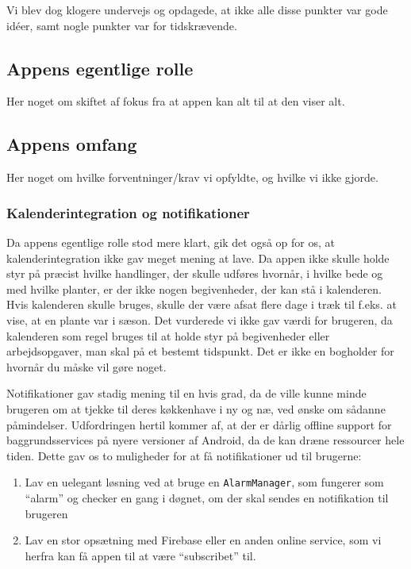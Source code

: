 Vi blev dog klogere undervejs og opdagede, at ikke alle disse punkter var gode idéer, samt nogle punkter var for tidskrævende.

\subsection{Appens egentlige rolle}
Her noget om skiftet af fokus fra at appen kan alt til at den viser alt.

\subsection{Appens omfang}
Her noget om hvilke forventninger/krav vi opfyldte, og hvilke vi ikke gjorde.

\subsubsection{Kalenderintegration og notifikationer}
Da appens egentlige rolle stod mere klart, gik det også op for os, at kalenderintegration ikke gav meget mening at lave. Da appen ikke skulle holde styr på præcist hvilke handlinger, der skulle udføres hvornår, i hvilke bede og med hvilke planter, er der ikke nogen begivenheder, der kan stå i kalenderen. Hvis kalenderen skulle bruges, skulle der være afsat flere dage i træk til f.eks. at vise, at en plante var i sæson. Det vurderede vi ikke gav værdi for brugeren, da kalenderen som regel bruges til at holde styr på begivenheder eller arbejdsopgaver, man skal på et bestemt tidspunkt. Det er ikke en bogholder for hvornår du måske vil gøre noget.

Notifikationer gav stadig mening til en hvis grad, da de ville kunne minde brugeren om at tjekke til deres køkkenhave i ny og næ, ved ønske om sådanne påmindelser. Udfordringen hertil kommer af, at der er dårlig offline support for baggrundsservices på nyere versioner af Android, da de kan dræne ressourcer hele tiden. Dette gav os to muligheder for at få notifikationer ud til brugerne:

\begin{enumerate}
    \item Lav en uelegant løsning ved at bruge en \texttt{AlarmManager}, som fungerer som ``alarm'' og checker en gang i døgnet, om der skal sendes en notifikation til brugeren
    \item Lav en stor opsætning med Firebase eller en anden online service, som vi herfra kan få appen til at være ``subscribet'' til.
\end{enumerate}


